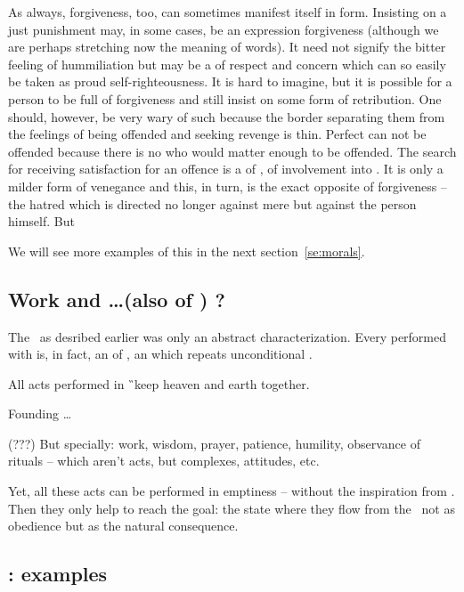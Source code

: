 As always, forgiveness, too, can sometimes manifest itself in
 form.  Insisting on a just punishment may, in some
cases, be an expression forgiveness  (although we are perhaps stretching
now the meaning of words).  It need not signify the
bitter feeling of hummiliation but may be a  of respect and
concern which can so easily be taken as proud self-righteousness.  It
is hard to imagine, but it is possible for a person to be full of
forgiveness and still insist on some form of retribution.  One should,
however, be very wary of such  because the border separating them
from the feelings of  being offended and seeking revenge
is  thin.  
Perfect  can not be offended because there is no  
who would matter enough to be offended.
The search for receiving satisfaction for an
offence is a  of , of involvement into 
. It is only a milder form of venegance and this, in turn, is the
exact opposite of forgiveness -- the hatred which is directed no
longer against mere  but against the person himself. But
               
\say
We will see more examples of this  in the 
next section~\ref{se:morals}.


\subsection{Work and \ldots (also of \sch) ?}
\pa
The \sch\ as desribed earlier was only an abstract characterization. 
Every  performed with  is, in fact, an  of 
\sch, an  which repeats unconditional \yes.


\pa\label{actmodes}
All acts performed in \G\ keep heaven and earth together.

Founding \ldots

\pa (???)
But specially:  work, wisdom, prayer, patience, humility, 
observance of rituals -- which aren't acts, but complexes, attitudes, etc.

\pa
Yet, all these acts can be performed in emptiness -- without the inspiration
from \HH. Then they only help to reach the goal: the state where they flow
from the \HH\ not as obedience but as the natural consequence.



\subsection{: examples}


